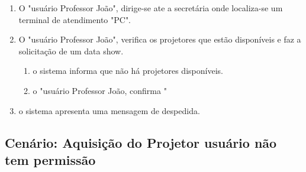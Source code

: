 \begin{enumerate}

  \item O "usuário Professor João", dirige-se ate a secretária onde localiza-se
    um terminal de atendimento "PC".

  \item O "usuário Professor João", verifica os projetores que estão disponíveis
    e faz a solicitação de um data show.

    \begin{enumerate}
  
      \item o sistema informa que não há projetores disponíveis.
        
      \item o "usuário Professor João, confirma "

    \end{enumerate}
    
  \item o sistema apresenta uma mensagem de despedida. 
 

\end{enumerate}

\subsection{Cenário: Aquisição do Projetor usuário não tem permissão}

